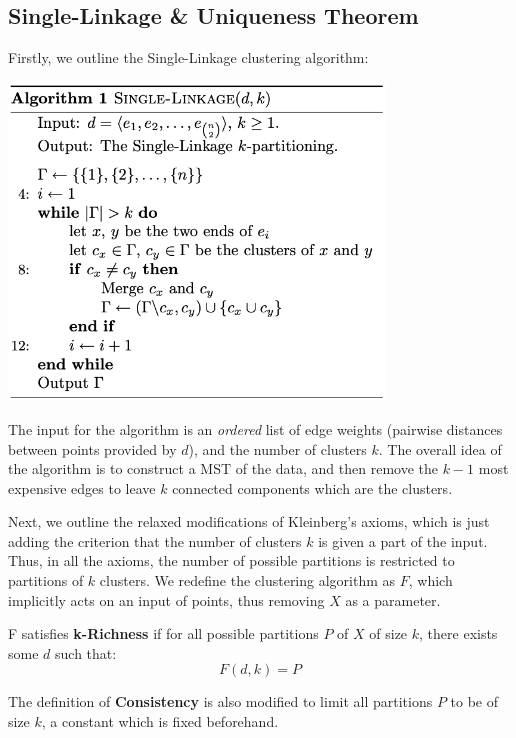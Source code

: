 \subsection*{Single-Linkage \& Uniqueness Theorem}

Firstly, we outline the Single-Linkage clustering algorithm:

\begin{center}
    \includegraphics[width = 10cm]{chapter_4/files/single_linkage.png}
\end{center}

The input for the algorithm is an \textit{ordered} list of edge weights (pairwise distances between points provided by $d$), and the number of clusters $k$. The overall idea of the algorithm is to construct a MST of the data, and then remove the $k-1$ most expensive edges to leave $k$ connected components which are the clusters.

\medskip

Next, we outline the relaxed modifications of Kleinberg's axioms, which is just adding the criterion that the number of clusters $k$ is given a part of the input. Thus, in all the axioms, the number of possible partitions is restricted to partitions of $k$ clusters. We redefine the clustering algorithm as $F$, which implicitly acts on an input of points, thus removing $X$ as a parameter.

\begin{definition}
    F satisfies \textbf{k-Richness} if for all possible partitions $P$ of $X$ of size $k$, there exists some $d$ such that:
    $$
    F(d, k) = P
    $$
\end{definition}

The definition of \textbf{Consistency} is also modified to limit all partitions $P$ to be of size $k$, a constant which is fixed beforehand.

